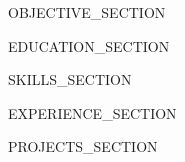 \documentclass{resume}
\begin{document}
{{OBJECTIVE_SECTION}}

{{EDUCATION_SECTION}}

{{SKILLS_SECTION}}

{{EXPERIENCE_SECTION}}

{{PROJECTS_SECTION}}
\end{document}
